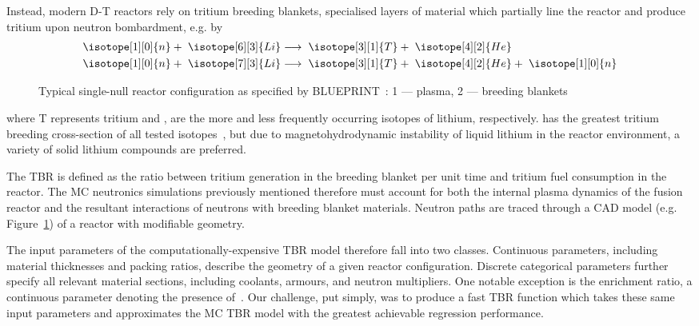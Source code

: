 Instead, modern D-T reactors rely on tritium breeding blankets, specialised
layers of material which partially line the reactor and produce tritium upon
neutron bombardment, e.g. by 
\begin{eqnarray}
	\isotope[1][0]{n} + \hspace{3pt} \isotope[6][3]{Li} 
	&\longrightarrow \hspace{3pt} 
	\isotope[3][1]{T} + \hspace{3pt}\isotope[4][2]{He} \\
	\isotope[1][0]{n} + \hspace{3pt} \isotope[7][3]{Li} 
	&\longrightarrow \hspace{3pt} 
	\isotope[3][1]{T} + \hspace{3pt} \isotope[4][2]{He} + \hspace{3pt} \isotope[1][0]{n}
\end{eqnarray}
\begin{figure}
  \centering
  \caption{Typical single-null reactor configuration as specified by BLUEPRINT~\cite{Coleman2019}: 1 — plasma,
2 — breeding blankets }
\label{fig:tokamak}
\end{figure}
where T represents tritium and ,  are the more and
less frequently occurring isotopes of lithium, respectively.  has
the greatest tritium breeding cross-section of all tested isotopes~\cite{Hernandez2018}, but due
to magnetohydrodynamic instability of liquid lithium in the reactor environment,
a variety of solid lithium compounds are preferred.

The TBR is defined as the ratio between tritium generation in the breeding
blanket per unit time and tritium fuel consumption in the reactor. The MC
neutronics simulations previously mentioned therefore must account for both the
internal plasma dynamics of the fusion reactor and the resultant interactions of
neutrons with breeding blanket materials. Neutron paths are traced through a CAD
model (e.g. Figure~\ref{fig:tokamak}) of a reactor with modifiable geometry.

The input parameters of the computationally-expensive TBR model therefore fall
into two classes. Continuous parameters, including material thicknesses and
packing ratios, describe the geometry of a given reactor configuration. Discrete
categorical parameters further specify all relevant material sections, including
coolants, armours, and neutron multipliers. One notable exception is the
enrichment ratio, a continuous parameter denoting the presence
of~. Our challenge, put simply, was to produce a fast TBR
function which takes these same input parameters and approximates the MC TBR
model with the greatest achievable regression performance.

